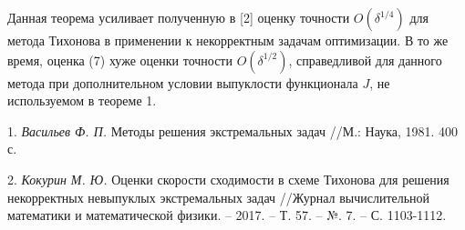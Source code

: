 Данная теорема усиливает полученную в [2] оценку точности $O(\delta^{1/4})$ для метода Тихонова в применении к некорректным задачам оптимизации. В то же время, оценка (7) хуже оценки точности $O(\delta^{1/2})$, справедливой для данного метода при дополнительном условии выпуклости функционала $J$, не используемом в теореме 1.

\litlist

1. {\it Васильев Ф. П.} Методы решения экстремальных задач //М.: Наука, 1981. 400 с.

2. {\it Кокурин М. Ю.} Оценки скорости сходимости в схеме Тихонова для решения некорректных невыпуклых экстремальных задач //Журнал вычислительной математики и математической физики. – 2017. – Т. 57. – №. 7. – С. 1103-1112.
